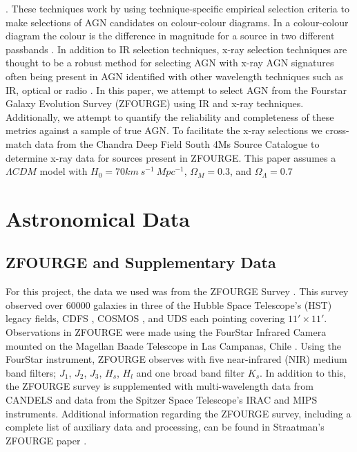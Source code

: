 \documentclass[11pt]{iopart}
\begin{document}
\cite{lacy_obscured_2004--stern_midinfrared_2005--donley_identifying_2012}. These techniques work by using technique-specific empirical selection criteria to make selections of AGN candidates on colour-colour diagrams. In a colour-colour diagram the colour is the difference in magnitude for a source in two different passbands \cite{bessell_ubvri_1990}. In addition to IR selection techniques, x-ray selection techniques are thought to be a robust method for selecting AGN with x-ray AGN signatures often being present in AGN identified with other wavelength techniques such as IR, optical or radio \cite{brandt_cosmic_2015}. In this paper, we attempt to select AGN from the Fourstar Galaxy Evolution Survey (ZFOURGE) \cite{straatman_fourstar_2016} using IR and x-ray techniques. Additionally, we attempt to quantify the reliability and completeness of these metrics against a sample of true AGN. To facilitate the x-ray selections we cross-match data from the Chandra Deep Field South 4Ms Source Catalogue \cite{xue_chandra_2011} to determine x-ray data for sources present in ZFOURGE. This paper assumes a $\Lambda CDM$ model with $H_0 = 70 km \ s^{-1} \ Mpc^{-1}$, $\Omega_M = 0.3$, and $\Omega_{\Lambda} = 0.7$ 
\section{Astronomical Data}
\subsection{ZFOURGE and Supplementary Data}
For this project, the data we used was from the ZFOURGE Survey \cite{straatman_fourstar_2016}. This survey observed over 60000 galaxies in three of the Hubble Space Telescope's (HST) legacy fields, CDFS \cite{giacconi_chandra_2002}, COSMOS \cite{scoville_cosmic_2007}, and UDS \cite{lawrence_ukirt_2007} each pointing covering $11' \times 11'$. Observations in ZFOURGE were made using the FourStar Infrared Camera mounted on the Magellan Baade Telescope in Las Campanas, Chile \cite{persson_fourstar_2013}. Using the FourStar instrument, ZFOURGE observes with five near-infrared (NIR) medium band filters; $J_1$, $J_2$, $J_3$, $H_s$, $H_l$ and one broad band filter $K_s$. In addition to this, the ZFOURGE survey is supplemented with multi-wavelength data from CANDELS \cite{grogin_candels_2011, koekemoer_candels_2011} and data from the Spitzer Space Telescope's IRAC \cite{fazio_infrared_2004} and MIPS \cite{rieke_multiband_2004} instruments. Additional information regarding the ZFOURGE survey, including a complete list of auxiliary data and processing, can be found in Straatman's ZFOURGE paper \cite{straatman_fourstar_2016}.
\end{document}
